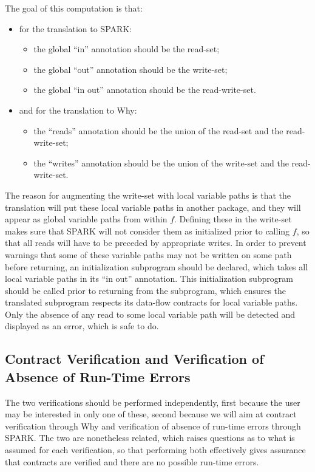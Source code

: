 \documentclass[fullpage]{article}
\begin{document}
The goal of this computation is that:
\begin{itemize}
\item for the translation to SPARK:
\begin{itemize}
\item the global ``in'' annotation should be the read-set;
\item the global ``out'' annotation should be the write-set;
\item the global ``in out'' annotation should be the read-write-set.
\end{itemize}
\item and for the translation to Why:
\begin{itemize}
\item the ``reads'' annotation should be the union of the read-set and the
  read-write-set;
\item the ``writes'' annotation should be the union of the write-set and the
  read-write-set.
\end{itemize}
\end{itemize}

The reason for augmenting the write-set with local variable paths is that the
translation will put these local variable paths in another package, and they
will appear as global variable paths from within $f$. Defining these in the
write-set makes sure that SPARK will not consider them as initialized prior to
calling $f$, so that all reads will have to be preceded by appropriate
writes. In order to prevent warnings that some of these variable paths may not
be written on some path before returning, an initialization subprogram should
be declared, which takes all local variable paths in its ``in out''
annotation. This initialization subprogram should be called prior to returning
from the subprogram, which ensures the translated subprogram respects its
data-flow contracts for local variable paths. Only the absence of any read to
some local variable path will be detected and displayed as an error, which is
safe to do.

\subsection{Contract Verification and Verification of Absence of Run-Time Errors}

The two verifications should be performed independently, first because the user
may be interested in only one of these, second because we will aim at contract
verification through Why and verification of absence of run-time errors through
SPARK. The two are nonetheless related, which raises questions as to what is
assumed for each verification, so that performing both effectively gives
assurance that contracts are verified and there are no possible run-time
errors.
\end{document}
